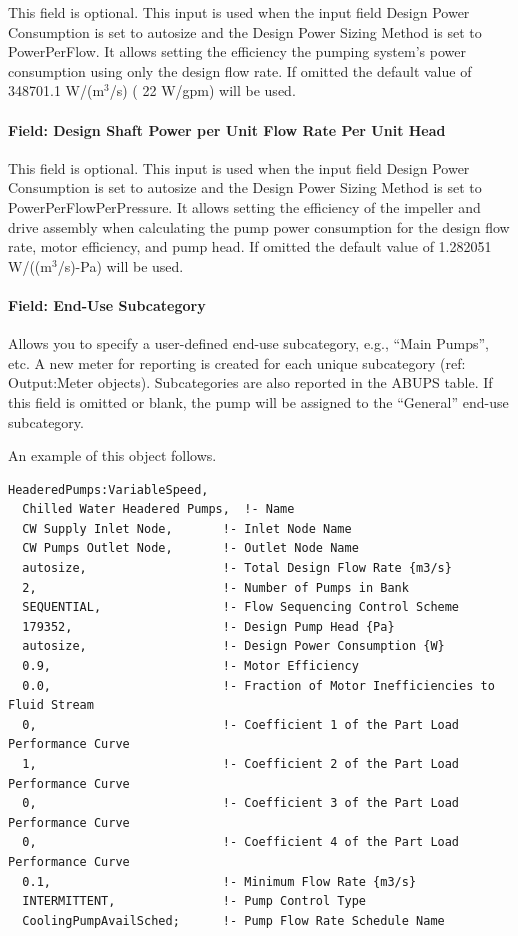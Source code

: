 This field is optional. This input is used when the input field Design Power Consumption is set to autosize and the Design Power Sizing Method is set to PowerPerFlow. It allows setting the efficiency the pumping system's power consumption using only the design flow rate. If omitted the default value of 348701.1 W/(m\(^{3}\)/s) ( 22 W/gpm) will be used.

\paragraph{Field: Design Shaft Power per Unit Flow Rate Per Unit Head}\label{field-design-shaft-power-per-unit-flow-rate-per-unit-head-4}

This field is optional. This input is used when the input field Design Power Consumption is set to autosize and the Design Power Sizing Method is set to PowerPerFlowPerPressure. It allows setting the efficiency of the impeller and drive assembly when calculating the pump power consumption for the design flow rate, motor efficiency, and pump head. If omitted the default value of 1.282051 W/((m\(^{3}\)/s)-Pa) will be used.

\paragraph{Field: End-Use Subcategory}

Allows you to specify a user-defined end-use subcategory, e.g., ``Main Pumps'', etc. A new meter for reporting is created for each unique subcategory (ref: Output:Meter objects). Subcategories are also reported in the ABUPS table. If this field is omitted or blank, the pump will be assigned to the ``General'' end-use subcategory.

An example of this object follows.

\begin{lstlisting}
HeaderedPumps:VariableSpeed,
  Chilled Water Headered Pumps,  !- Name
  CW Supply Inlet Node,       !- Inlet Node Name
  CW Pumps Outlet Node,       !- Outlet Node Name
  autosize,                   !- Total Design Flow Rate {m3/s}
  2,                          !- Number of Pumps in Bank
  SEQUENTIAL,                 !- Flow Sequencing Control Scheme
  179352,                     !- Design Pump Head {Pa}
  autosize,                   !- Design Power Consumption {W}
  0.9,                        !- Motor Efficiency
  0.0,                        !- Fraction of Motor Inefficiencies to Fluid Stream
  0,                          !- Coefficient 1 of the Part Load Performance Curve
  1,                          !- Coefficient 2 of the Part Load Performance Curve
  0,                          !- Coefficient 3 of the Part Load Performance Curve
  0,                          !- Coefficient 4 of the Part Load Performance Curve
  0.1,                        !- Minimum Flow Rate {m3/s}
  INTERMITTENT,               !- Pump Control Type
  CoolingPumpAvailSched;      !- Pump Flow Rate Schedule Name
\end{lstlisting}

